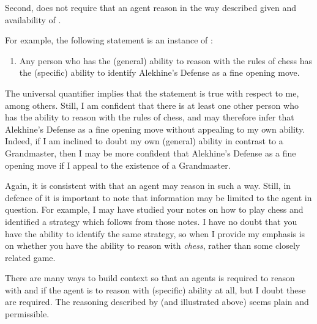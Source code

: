 \begin{note}
  Second, \eA{} does not require that an agent reason in the way described given \gsi{} and availability of .

  For example, the following statement is an instance of \gsi{}:
  \begin{enumerate}
  \item Any person who has the (general) ability to reason with the rules of chess has the (specific) ability to identify Alekhine's Defense as a fine opening move.
  \end{enumerate}
  The universal quantifier implies that the statement is true with respect to me, among others.
  Still, I am confident that there is at least one other person who has the ability to reason with the rules of chess, and may therefore infer that Alekhine's Defense as a fine opening move without appealing to my own ability.
  Indeed, if I am inclined to doubt my own (general) ability in contrast to a Grandmaster, then I may be more confident that Alekhine's Defense as a fine opening move if I appeal to the existence of a Grandmaster.

  Again, it is consistent with \eA{} that an agent may reason in such a way.
  Still, in defence of \eA{} it is important to note that \gsi{} information may be limited to the agent in question.
  For example, I may have studied your notes on how to play chess and identified a strategy which follows from those notes.
  I have no doubt that you have the ability to identify the same strategy, so when I provide \gsi{} my emphasis is on whether you have the ability to reason with \emph{chess}, rather than some closely related game.

  There are many ways to build context so that an agents is required to reason with \gsi{} and  if the agent is to reason with (specific) ability at all, but I doubt these are required.
  The reasoning described by \eA{} (and illustrated above) seems plain and permissible.
\end{note}


